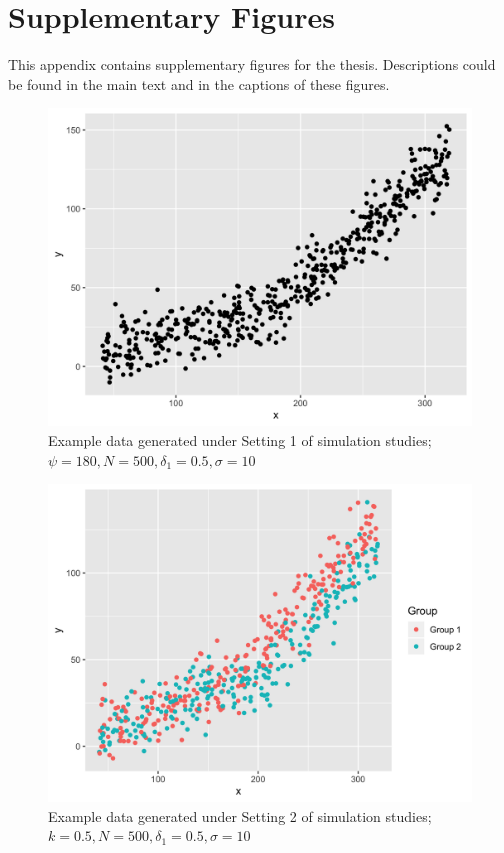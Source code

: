 \documentclass [12pt, proquest] {uwthesis}[2016/11/22]
\begin{document}
 
\chapter{Supplementary Figures}

This appendix contains supplementary figures for the thesis. Descriptions could be found in the main text and in the captions of these figures.

\begin{figure}
    \centering
    \includegraphics[width = 6 in]{PlotA_1.png}
    \caption{Example data generated under Setting 1 of simulation studies; $\psi = 180, N = 500, \delta_1 = 0.5, \sigma = 10$}
\end{figure}

\begin{figure}
    \centering
    \includegraphics[width = 6 in]{PlotA_2.png}
    \caption{Example data generated under Setting 2 of simulation studies; $k = 0.5, N = 500, \delta_1 = 0.5, \sigma = 10$}
\end{figure}
\end{document}

